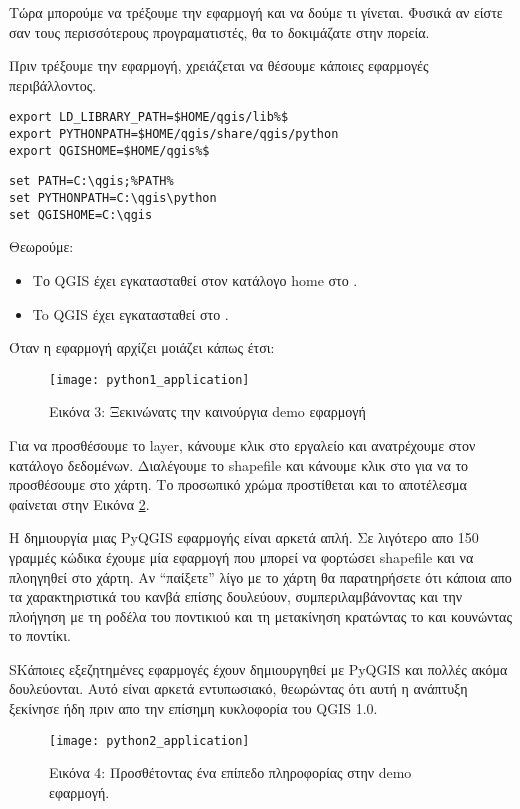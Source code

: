 Τώρα μπορούμε να τρέξουμε την εφαρμογή και να δούμε τι γίνεται. Φυσικά αν είστε σαν τους περισσότερους προγραματιστές, θα το δοκιμάζατε στην πορεία. 

Πριν τρέξουμε την εφαρμογή, χρειάζεται να θέσουμε κάποιες εφαρμογές περιβάλλοντος. 

\nix{}\osx{}
\begin{verbatim}
export LD_LIBRARY_PATH=$HOME/qgis/lib%$
export PYTHONPATH=$HOME/qgis/share/qgis/python
export QGISHOME=$HOME/qgis%$
\end{verbatim}

\win{}
\begin{verbatim}
set PATH=C:\qgis;%PATH%
set PYTHONPATH=C:\qgis\python
set QGISHOME=C:\qgis
\end{verbatim}

Θεωρούμε: 
\begin{itemize}
\item\nix{}\osx{}Το QGIS έχει εγκατασταθεί στον κατάλογο home στο 
. 
\item\win{}To QGIS έχει εγκατασταθεί στο .
\end{itemize}

Όταν η εφαρμογή αρχίζει μοιάζει κάπως έτσι: 

\begin{figure}[ht]
\begin{center}
  \caption{Εικόνα 3: Ξεκινώνατς την καινούργια demo εφαρμογή \nixcaption} \label{fig:demo_app_startup}
  \texttt{[image: python1\_application]}
\end{center}
\end{figure}

Για να προσθέσουμε το  layer, κάνουμε κλικ στο εργαλείο
 και ανατρέχουμε στον κατάλογο δεδομένων.
Διαλέγουμε το shapefile και κάνουμε κλικ στο  για να το προσθέσουμε στο χάρτη. 
Το προσωπικό χρώμα προστίθεται και το αποτέλεσμα φαίνεται στην Εικόνα \ref{fig:demo_app_done}.

Η δημιουργία μιας PyQGIS εφαρμογής είναι αρκετά απλή. Σε λιγότερο απο 150 γραμμές κώδικα έχουμε μία εφαρμογή που μπορεί να φορτώσει shapefile και να πλοηγηθεί στο χάρτη. Αν “παίξετε” λίγο με το χάρτη θα παρατηρήσετε ότι κάποια απο τα χαρακτηριστικά του κανβά επίσης δουλεύουν, συμπεριλαμβάνοντας και την πλοήγηση με τη ροδέλα του ποντικιού και τη μετακίνηση κρατώντας το  και κουνώντας το ποντίκι. 

SΚάποιες εξεζητημένες εφαρμογές έχουν δημιουργηθεί με PyQGIS και πολλές ακόμα δουλεύονται. Αυτό είναι αρκετά εντυπωσιακό, θεωρώντας ότι αυτή η ανάπτυξη ξεκίνησε ήδη πριν απο την επίσημη κυκλοφορία του QGIS 1.0.

\begin{figure}[ht]
\begin{center}
  \caption{Εικόνα 4: Προσθέτοντας ένα επίπεδο πληροφορίας στην demo εφαρμογή.\nixcaption} \label{fig:demo_app_done}
  \texttt{[image: python2\_application]}
\end{center}
\end{figure}

